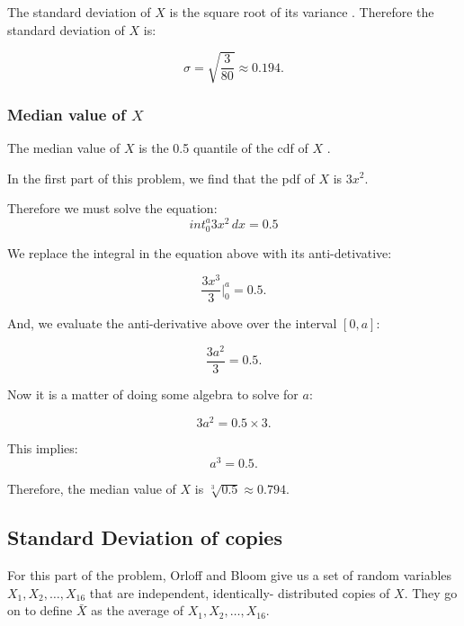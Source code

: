 \documentclass[a4paper,11pt]{article}
\begin{document}
The standard deviation of $X$ is the square root of its variance \cite{reading6a}.  Therefore the standard deviation of $X$ is:

\begin{equation}
\sigma=\sqrt{\frac{3}{80}} \approx
  0.194.
\end{equation}

\subsubsection{Median value of $X$}
The median value of $X$ is the 0.5
quantile of the cdf of $X$
\cite{reading6a}.

In the first part of this problem,
we find that the pdf of $X$ is
$3x^2$.

Therefore we must solve the equation:
\begin{equation}
int_0^a 3x^2 \,dx = 0.5
\end{equation}

We replace the integral in the
equation above with its
anti-detivative:

\begin{equation}
\frac{3x^3}{3} \bigg\rvert_0^a=0.5.
\end{equation}

And, we evaluate the anti-derivative
above over the interval $\left[0,a
\right]$:

\begin{equation}
\frac{3a^2}{3}=0.5.
\end{equation}

Now it is a matter of doing some
algebra to solve for $a$:

\begin{equation}
3a^2=0.5 \times 3.
\end{equation}

This implies:
\begin{equation}
a^3=0.5.
\end{equation}

Therefore, the median value of $X$ is
$\sqrt[3]{0.5} \approx 0.794$.

\subsection{Standard Deviation of
copies}

For this part of the problem, Orloff
and Bloom give us a set of
random variables $X_1, X_2, \ldots,
X_16$ that are independent, identically-
distributed copies of $X$.
They go on to define $\bar{X}$ as the
average of $X_1, X_2, \ldots, X_16$.
\end{document}
